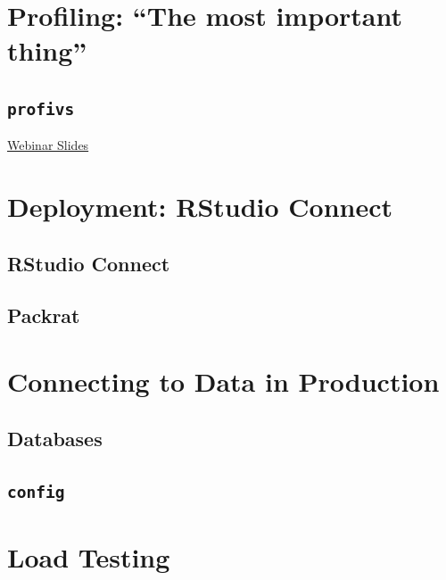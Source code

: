 \documentclass[]{book}
\theoremstyle{definition}
\theoremstyle{definition}
\theoremstyle{definition}
\theoremstyle{remark}
\begin{document}
\hypertarget{profiling-the-most-important-thing}{%
\chapter{Profiling: ``The most important
thing''}\label{profiling-the-most-important-thing}}

\hypertarget{profivs}{%
\section{\texorpdfstring{\texttt{profivs}}{profivs}}\label{profivs}}

\href{https://github.com/rstudio/webinars/blob/master/26-Profiling/Profiling.pdf}{Webinar
Slides}

\hypertarget{deployment-rstudio-connect}{%
\chapter{Deployment: RStudio Connect}\label{deployment-rstudio-connect}}

\hypertarget{rstudio-connect}{%
\section{RStudio Connect}\label{rstudio-connect}}

\hypertarget{packrat}{%
\section{Packrat}\label{packrat}}

\hypertarget{connecting-to-data-in-production}{%
\chapter{Connecting to Data in
Production}\label{connecting-to-data-in-production}}

\hypertarget{databases}{%
\section{Databases}\label{databases}}

\hypertarget{config}{%
\section{\texorpdfstring{\texttt{config}}{config}}\label{config}}

\hypertarget{load-testing}{%
\chapter{Load Testing}\label{load-testing}}
\end{document}
